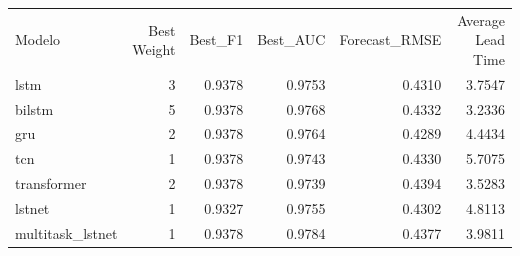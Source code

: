 \begin{tabular}{lrrrrr}
Modelo & Best Weight & Best_F1 & Best_AUC & Forecast_RMSE & Average Lead Time \\
lstm & 3 & 0.9378 & 0.9753 & 0.4310 & 3.7547 \\
bilstm & 5 & 0.9378 & 0.9768 & 0.4332 & 3.2336 \\
gru & 2 & 0.9378 & 0.9764 & 0.4289 & 4.4434 \\
tcn & 1 & 0.9378 & 0.9743 & 0.4330 & 5.7075 \\
transformer & 2 & 0.9378 & 0.9739 & 0.4394 & 3.5283 \\
lstnet & 1 & 0.9327 & 0.9755 & 0.4302 & 4.8113 \\
multitask_lstnet & 1 & 0.9378 & 0.9784 & 0.4377 & 3.9811 \\
\end{tabular}
